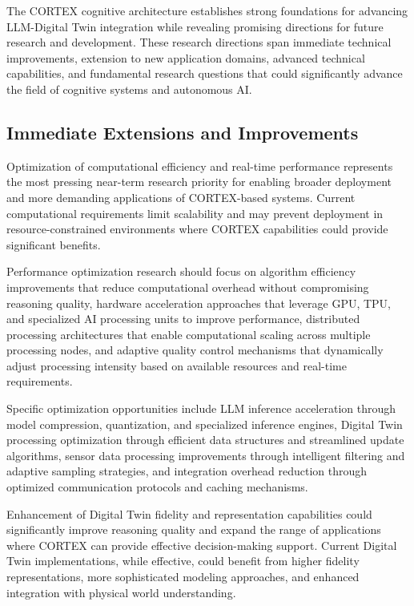 The CORTEX cognitive architecture establishes strong foundations for advancing LLM-Digital Twin integration while revealing promising directions for future research and development. These research directions span immediate technical improvements, extension to new application domains, advanced technical capabilities, and fundamental research questions that could significantly advance the field of cognitive systems and autonomous AI.

\subsection{Immediate Extensions and Improvements}

Optimization of computational efficiency and real-time performance represents the most pressing near-term research priority for enabling broader deployment and more demanding applications of CORTEX-based systems. Current computational requirements limit scalability and may prevent deployment in resource-constrained environments where CORTEX capabilities could provide significant benefits.

Performance optimization research should focus on algorithm efficiency improvements that reduce computational overhead without compromising reasoning quality, hardware acceleration approaches that leverage GPU, TPU, and specialized AI processing units to improve performance, distributed processing architectures that enable computational scaling across multiple processing nodes, and adaptive quality control mechanisms that dynamically adjust processing intensity based on available resources and real-time requirements.

Specific optimization opportunities include LLM inference acceleration through model compression, quantization, and specialized inference engines, Digital Twin processing optimization through efficient data structures and streamlined update algorithms, sensor data processing improvements through intelligent filtering and adaptive sampling strategies, and integration overhead reduction through optimized communication protocols and caching mechanisms.

Enhancement of Digital Twin fidelity and representation capabilities could significantly improve reasoning quality and expand the range of applications where CORTEX can provide effective decision-making support. Current Digital Twin implementations, while effective, could benefit from higher fidelity representations, more sophisticated modeling approaches, and enhanced integration with physical world understanding.

